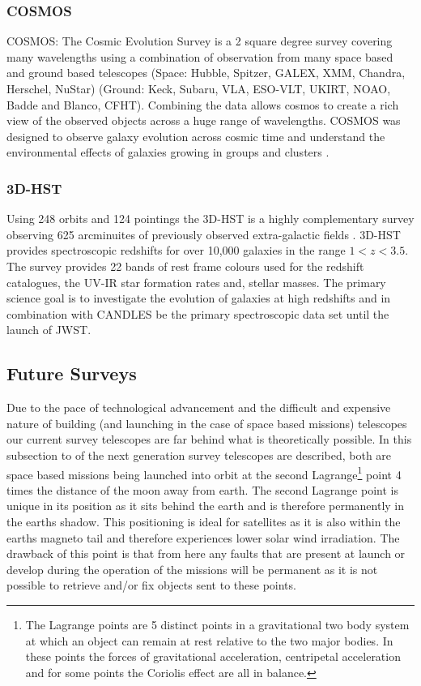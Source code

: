 \subsubsection{COSMOS}

COSMOS: The Cosmic Evolution Survey is a 2 square degree survey covering many wavelengths using a combination of observation from many space based and ground based telescopes (Space: Hubble, Spitzer, GALEX, XMM, Chandra, Herschel, NuStar) (Ground: Keck, Subaru, VLA, ESO-VLT, UKIRT, NOAO, Badde and Blanco, CFHT). Combining the data allows cosmos to create a rich view of the observed objects across a huge range of wavelengths. COSMOS was designed to observe galaxy evolution across cosmic time and understand the environmental effects of galaxies growing in groups and clusters \citep{HomeCOSMOS}.

\subsubsection{3D-HST}

Using 248 orbits and 124 pointings the 3D-HST is a highly complementary survey observing 625 arcminuites of previously observed extra-galactic fields \citep{Brammer20123D-HST:Telescope}. 3D-HST provides spectroscopic redshifts for over 10,000 galaxies in the range $1 < z < 3.5$. The survey provides 22 bands of rest frame colours used for the redshift catalogues, the UV-IR star formation rates and, stellar masses. The primary science goal is to investigate the evolution of galaxies at high redshifts and in combination with CANDLES be the primary spectroscopic data set until the launch of JWST.

\subsection{Future Surveys}

Due to the pace of technological advancement and the difficult and expensive nature of building (and launching in the case of space based missions) telescopes our current survey telescopes are far behind what is theoretically possible. In this subsection to of the next generation survey telescopes are described, both are space based missions being launched into orbit at the second Lagrange\footnote{The Lagrange points are 5 distinct points in a gravitational two body system at which an object can remain at rest relative to the two major bodies. In these points the forces of gravitational acceleration, centripetal acceleration and for some points the Coriolis effect are all in balance.} point 4 times the distance of the moon away from earth. The second Lagrange point is unique in its position as it sits behind the earth and is therefore permanently in the earths shadow. This positioning is ideal for satellites as it is also within the earths magneto tail and therefore experiences lower solar wind irradiation. The drawback of this point is that from here any faults that are present at launch or develop during the operation of the missions will be permanent as it is not possible to retrieve and/or fix objects sent to these points.

